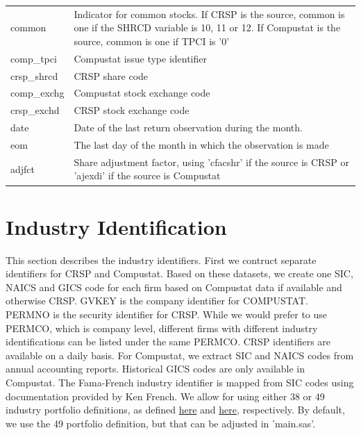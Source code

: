 \documentclass[12pt,title,fleqn]{article}
\begin{document}
{\begin{longtable}{@{\extracolsep{\fill}}|l|m{14.2cm}|@{}}
		common & Indicator for common stocks. If CRSP is the source, common is one if the SHRCD variable is 10, 11 or 12. If Compustat is the source, common is one if TPCI is '0'  \\[1ex]
		
		comp\_tpci & Compustat issue type identifier \\[1ex]
		
		crsp\_shrcd & CRSP share code\\[1ex]
		
		comp\_exchg & Compustat stock exchange code \\[1ex]
		
		crsp\_exchd & CRSP stock exchange code \\[1ex]
		
		date & Date of the last return observation during the month. \\[1ex]
		
		eom & The last day of the month in which the observation is made\\[1ex]
		
		adjfct & Share adjustment factor, using 'cfacshr' if the source is CRSP or 'ajexdi' if the source is Compustat \\
	
\end{longtable}
}

\section{Industry Identification}
    This section describes the industry identifiers. First we contruct separate identifiers for CRSP and Compustat. Based on these datasets, we create one SIC, NAICS and GICS code for each firm based on Compustat data if available and otherwise CRSP. GVKEY is the company identifier for COMPUSTAT. PERMNO is the security identifier for CRSP. While we would prefer to use PERMCO, which is company level, different firms with different industry identifications can be listed under the same PERMCO. CRSP identifiers are available on a daily basis. For Compustat, we extract SIC and NAICS codes from annual accounting reports. Historical GICS codes are only available in Compustat. The Fama-French industry identifier is mapped from SIC codes using documentation provided by Ken French. We allow for using either 38 or 49 industry portfolio definitions, as defined  \href{https://mba.tuck.dartmouth.edu/pages/faculty/ken.french/Data_Library/det_38_ind_port.html}{here} and \href{https://mba.tuck.dartmouth.edu/pages/faculty/ken.french/Data_Library/det_49_ind_port.html}{here}, respectively. By default, we use the 49 portfolio definition, but that can be adjusted in 'main.sas'.
\end{document}
